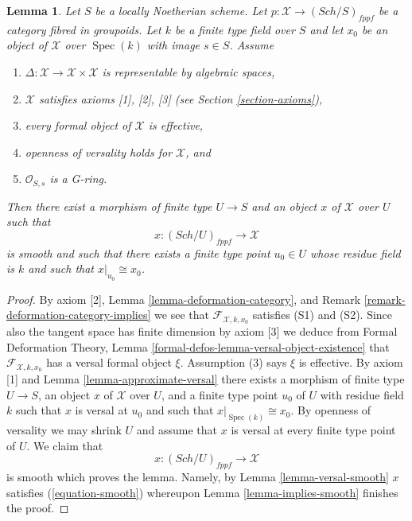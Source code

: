 \documentclass[10pt,a4paper]{amsart}
\theoremstyle{plain}
\newtheorem{lemma}[subsection]{Lemma}
\theoremstyle{definition}
\theoremstyle{remark}
\numberwithin{equation}{subsection}
\def\Spec{\mathop{\mathrm{Spec}}}
\def\Sch{\mathit{Sch}}
\begin{document}
\begin{lemma}
\label{lemma-get-smooth}
Let $S$ be a locally Noetherian scheme. Let
$p : \mathcal{X} \to (\Sch/S)_{fppf}$ be a category fibred in groupoids.
Let $k$ be a finite type field over $S$ and let $x_0$ be an object of
$\mathcal{X}$ over $\Spec(k)$ with image $s \in S$. Assume
\begin{enumerate}
\item $\Delta : \mathcal{X} \to \mathcal{X} \times \mathcal{X}$ is
representable by algebraic spaces,
\item $\mathcal{X}$ satisfies axioms [1], [2], [3] (see
Section \ref{section-axioms}),
\item every formal object of $\mathcal{X}$ is effective,
\item openness of versality holds for $\mathcal{X}$, and
\item $\mathcal{O}_{S, s}$ is a G-ring.
\end{enumerate}
Then there exist a morphism of finite type $U \to S$ and an object
$x$ of $\mathcal{X}$ over $U$ such that
$$
x : (\Sch/U)_{fppf} \longrightarrow \mathcal{X}
$$
is smooth and such that there exists a finite type point $u_0 \in U$
whose residue field is $k$ and such that $x|_{u_0} \cong x_0$.
\end{lemma}

\begin{proof}
By axiom [2], Lemma \ref{lemma-deformation-category}, and
Remark \ref{remark-deformation-category-implies}
we see that $\mathcal{F}_{\mathcal{X}, k, x_0}$ satisfies (S1) and (S2).
Since also the tangent space has finite dimension by axiom [3]
we deduce from Formal Deformation Theory, Lemma
\ref{formal-defos-lemma-versal-object-existence}
that $\mathcal{F}_{\mathcal{X}, k, x_0}$ has a versal formal object $\xi$.
Assumption (3) says $\xi$ is effective. By axiom [1] and
Lemma \ref{lemma-approximate-versal}
there exists a morphism of finite type $U \to S$, an object $x$ of
$\mathcal{X}$ over $U$, and a finite type point $u_0$ of $U$ with residue
field $k$ such that $x$ is versal at $u_0$ and such that
$x|_{\Spec(k)} \cong x_0$. By openness of versality we may shrink
$U$ and assume that $x$ is versal at every finite type point of $U$.
We claim that
$$
x : (\Sch/U)_{fppf} \longrightarrow \mathcal{X}
$$
is smooth which proves the lemma. Namely, by Lemma \ref{lemma-versal-smooth}
$x$ satisfies (\ref{equation-smooth})
whereupon Lemma \ref{lemma-implies-smooth}
finishes the proof.
\end{proof}
\end{document}
